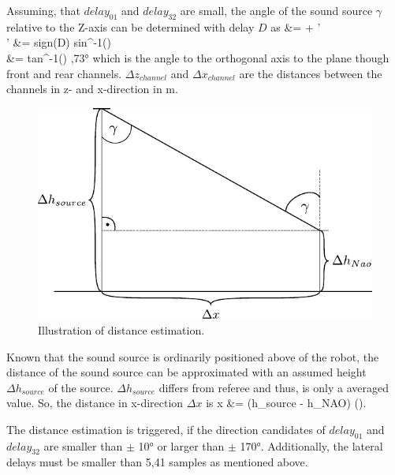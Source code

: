 Assuming, that $delay_{01}$ and $delay_{32}$ are small,
the angle of the sound source $\gamma$ relative
to the Z-axis can be determined with delay $D$ as
\bsub \bal
\gamma &= \alpha + \gamma'\\
\gamma' &= sign(D) \cdot sin^{-1}\left(\right)\\
\alpha &= tan^{-1}\left(\right) ,73\si{\degree}
\eal \esub
which is the angle to the orthogonal axis to the plane though
front and rear channels.
$\Delta z_{channel}$ and $\Delta x_{channel}$ are the distances between the channels
in z- and x-direction in \si{\meter}.
\begin{figure}[ht]
	\centering
		\includegraphics[width=0.6\columnwidth]{figures/x_distance}
	\caption{Illustration of distance estimation.}
    \label{fig:02_xDistance}
\end{figure}

Known that the sound source is ordinarily positioned above of the robot, the distance
of the sound source can be approximated with an assumed height $\Delta h_{source}$
of the source. $\Delta h_{source}$ differs from referee and thus, is only
a averaged value.
So, the distance in x-direction $\Delta x$ is
\bal
\Delta x &= (\Delta h_{source} - \Delta h_{NAO}) \cdot \tan(\gamma).
\label{eq:02_deltaX}
\eal

The distance estimation is triggered, if the direction candidates of
$delay_{01}$ and $delay_{32}$ are smaller than $\pm$ 10\si{\degree}
or larger than $\pm$ 170\si{\degree}.
Additionally, the lateral delays must be smaller than 5,41 samples as mentioned above.


